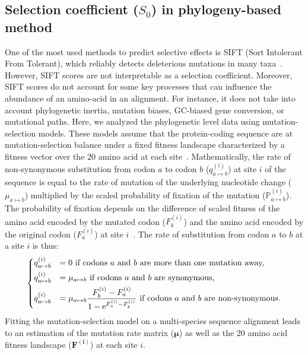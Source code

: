 \documentclass{article}
\newcommand{\UniDimArray}[1]{\bm{#1}}
\newcommand{\e}{\textrm{e}}
\newcommand{\proba}{\mathbb{P}}
\newcommand{\Sphy}{S_{0}}
\begin{document}
    \subsection{Selection coefficient ($\Sphy$) in phylogeny-based method}
    \label{subsec:s-phylogeny-method}
    One of the most used methods to predict selective effects is SIFT (Sort Intolerant From Tolerant), which reliably detects deleterious mutations in many taxa~\cite{ng_sift_2003, vaser_sift_2016}.
    However, SIFT scores are not interpretable as a selection coefficient.
    Moreover, SIFT scores do not account for some key processes that can influence the abundance of an amino-acid in an alignment.
    For instance, it does not take into account phylogenetic inertia, mutation biases, GC-biased gene conversion, or mutational paths.
    Here, we analyzed the phylogenetic level data using mutation-selection models.
    These models assume that the protein-coding sequence are at mutation-selection balance under a fixed fitness landscape characterized by a fitness vector over the $20$ amino acid at each site~\cite{yang_mutationselection_2008, halpern_evolutionary_1998, rodrigue_mechanistic_2010}.
    Mathematically, the rate of non-synonymous substitution from codon $a$ to codon $b$ ($q_{a \mapsto b}^{(i)}$) at site $i$ of the sequence is equal to the rate of mutation of the underlying nucleotide change ($\mu_{a \mapsto b}$) multiplied by the scaled probability of fixation of the mutation ($\proba_{a \mapsto b}^{(i)}$).
    The probability of fixation depends on the difference of scaled fitness of the amino acid encoded by the mutated codon ($F_b^{(i)}$) and the amino acid encoded by the original codon ($F_a^{(i)}$) at site $i$~\cite{wright_evolution_1931, fisher_genetical_1930}.
    The rate of substitution from codon $a$ to $b$ at a site $i$ is thus:
    \begin{equation}
        \begin{dcases}
            q_{a \mapsto b}^{(i)} & = 0 \text{ if codons $a$ and $b$ are more than one mutation away,} \\
            q_{a \mapsto b}^{(i)} & = \mu_{a \mapsto b} \text{ if codons $a$ and $b$ are synonymous,} \\
            q_{a \mapsto b}^{(i)} & = \mu_{a \mapsto b} \dfrac{F_b^{(i)} - F_a^{(i)}}{1 - \e^{F_a^{(i)} - F_b^{(i)}}} \text{ if codons $a$ and $b$ are non-synonymous}.
        \end{dcases}
    \end{equation}
    Fitting the mutation-selection model on a multi-species sequence alignment leads to an estimation of the mutation rate matrix ($\UniDimArray{\mu}$) as well as the 20 amino acid fitness landscape ($\UniDimArray{F^{(i)}}$) at each site $i$.
\end{document}
